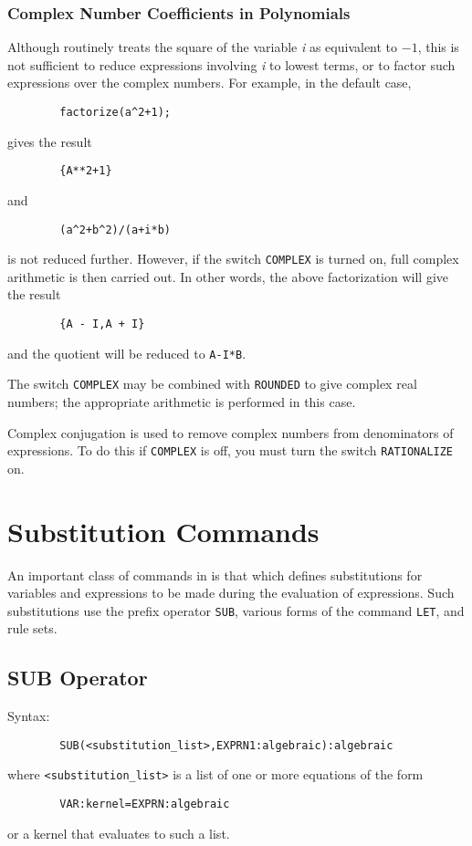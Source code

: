 \subsection{Complex Number Coefficients in Polynomials}
Although {\REDUCE} routinely treats the square of the variable {\em i} as
equivalent to $-1$, this is not sufficient to reduce expressions involving
{\em i} to lowest terms, or to factor such expressions over the complex
numbers.  For example, in the default case,
\begin{verbatim}
        factorize(a^2+1);
\end{verbatim}
gives the result
\begin{verbatim}
        {A**2+1}
\end{verbatim}
and
\begin{verbatim}
        (a^2+b^2)/(a+i*b)
\end{verbatim}
is not reduced further.  However, if the switch
{\tt COMPLEX}  is turned on, full complex arithmetic is then
carried out.  In other words, the above factorization will give the result
\begin{verbatim}
        {A - I,A + I}
\end{verbatim}
and the quotient will be reduced to {\tt A-I*B}.

The switch {\tt COMPLEX} may be combined with {\tt ROUNDED} to give complex
real numbers; the appropriate arithmetic is performed in this case.

Complex conjugation is used to remove complex numbers from denominators of
expressions.  To do this if {\tt COMPLEX} is off, you must turn the switch
{\tt RATIONALIZE}  on.

\chapter{Substitution Commands} 
An important class of commands in {\REDUCE} is that which defines
substitutions for variables and expressions to be made during the
evaluation of expressions.  Such substitutions use the prefix operator
{\tt SUB}, various forms of the command {\tt LET}, and rule sets.

\section{SUB Operator} 

Syntax:
\begin{verbatim}
        SUB(<substitution_list>,EXPRN1:algebraic):algebraic
\end{verbatim}
where {\tt <substitution\_list>} is a list of one or more equations of the
form
\begin{verbatim}
        VAR:kernel=EXPRN:algebraic
\end{verbatim}
or a kernel that evaluates to such a list.

